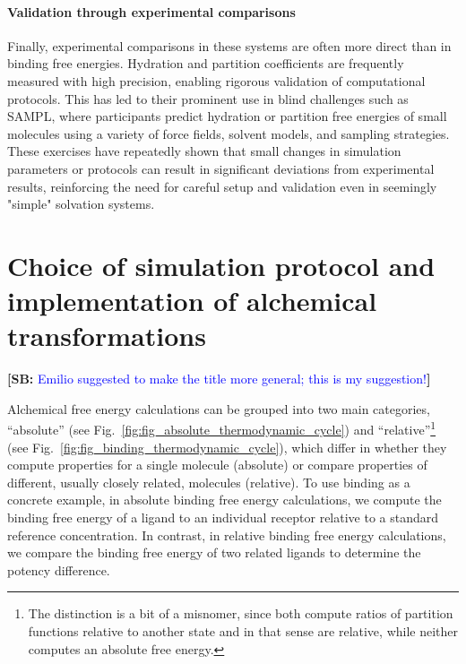 \documentclass[9pt,bestpractices]{livecoms}
\newcommand{\sbnote}[1]{%
  {\bfseries{}[SB: }%
  {\textcolor{blue}{#1}}{\bfseries{}]}
}
\begin{document}
\paragraph{Validation through experimental comparisons}  
Finally, experimental comparisons in these systems are often more direct than in binding free energies. Hydration and partition coefficients are frequently measured with high precision, enabling rigorous validation of computational protocols. This has led to their prominent use in blind challenges such as SAMPL, where participants predict hydration or partition free energies of small molecules using a variety of force fields, solvent models, and sampling strategies. These exercises have repeatedly shown that small changes in simulation parameters or protocols can result in significant deviations from experimental results, reinforcing the need for careful setup and validation even in seemingly "simple" solvation systems.


\section{Choice of simulation protocol and implementation of alchemical transformations}
  \sbnote{Emilio suggested to make the title more general; this is my suggestion!}
\label{sec:simulation_protocol_choice}
Alchemical free energy calculations can be grouped into two main categories, ``absolute'' (see Fig.~\ref{fig:fig_absolute_thermodynamic_cycle}) and ``relative''\footnote{The distinction is a bit of a misnomer, since both compute ratios of partition functions relative to another state and in that sense are relative, while neither computes an absolute free energy.} (see Fig.~\ref{fig:fig_binding_thermodynamic_cycle}), which differ in whether they compute properties for a single molecule (absolute) or compare properties of different, usually closely related, molecules (relative).
To use binding as a concrete example, in absolute binding free energy calculations, we compute the binding free energy of a ligand to an individual receptor relative to a standard reference concentration. In contrast, in relative binding free energy calculations, we compare the binding free energy of two related ligands to determine the potency difference.
\end{document}
